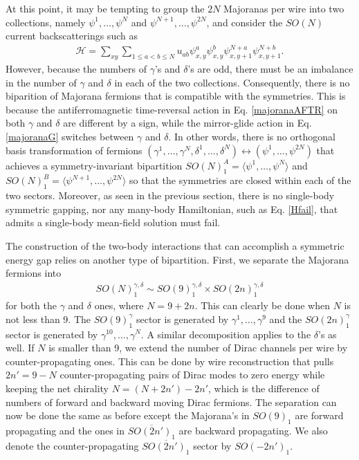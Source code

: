 At this point, it may be tempting to group the $2N$ Majoranas per wire into two collections, namely $\psi^1,\ldots,\psi^N$ and $\psi^{N+1},\ldots,\psi^{2N}$, and consider the $SO(N)$ current backscatterings such as \begin{align}\mathcal{H}=\sum_{xy}\sum_{1\leq a<b\leq N}u_{ab}\psi^a_{x,y}\psi^b_{x,y}\psi^{N+a}_{x,y+1}\psi^{N+b}_{x,y+1}.\label{Hfail}\end{align} However, because the numbers of $\gamma$'s and $\delta$'s are odd, there must be an imbalance in the number of $\gamma$ and $\delta$ in each of the two collections. Consequently, there is no biparition of Majorana fermions that is compatible with the symmetries. This is because the antiferromagnetic time-reversal action in Eq. \eqref{majoranaAFTR} on both $\gamma$ and $\delta$ are different by a sign, while the mirror-glide action in Eq. \eqref{majoranaG} switches between $\gamma$ and $\delta$. In other words, there is no orthogonal basis transformation of fermions $(\gamma^1,\ldots,\gamma^N,\delta^1,\ldots,\delta^N)\leftrightarrow(\psi^1,\ldots,\psi^{2N})$ that achieves a symmetry-invariant bipartition $SO(N)_1^A=\langle\psi^1,\ldots,\psi^N\rangle$ and $SO(N)_1^B=\langle\psi^{N+1},\ldots,\psi^{2N}\rangle$ so that the symmetries are closed within each of the two sectors. Moreover, as seen in the previous section, there is no single-body symmetric gapping, nor any many-body Hamiltonian, such as Eq. \eqref{Hfail}, that admits a single-body mean-field solution must fail.



The construction of the two-body interactions that can accomplish a symmetric energy gap relies on another type of bipartition. First, we separate the Majorana fermions into \begin{align}SO(N)_1^{\gamma,\delta}\sim SO(9)_1^{\gamma,\delta}\times SO(2n)_1^{\gamma,\delta}\end{align} for both the $\gamma$ and $\delta$ ones, where $N=9+2n$. This can clearly be done when $N$ is not less than 9. The $SO(9)_1^\gamma$ sector is generated by $\gamma^1,\ldots,\gamma^9$ and the $SO(2n)_1^\gamma$ sector is generated by $\gamma^{10},\ldots,\gamma^N$. A similar decomposition applies to the $\delta$'s as well. If $N$ is smaller than 9, we extend the number of Dirac channels per wire by counter-propagating ones. This can be done by wire reconstruction that pulls $2n'=9-N$ counter-propagating pairs of Dirac modes to zero energy while keeping the net chirality $N=(N+2n')-2n'$, which is the difference of numbers of forward and backward moving Dirac fermions. The separation can now be done the same as before except the Majorana's in $SO(9)_1$ are forward propagating and the ones in $\overline{SO(2n')_1}$ are backward propagating. We also denote the counter-propagating $\overline{SO(2n')_1}$ sector by $SO(-2n')_1$.

